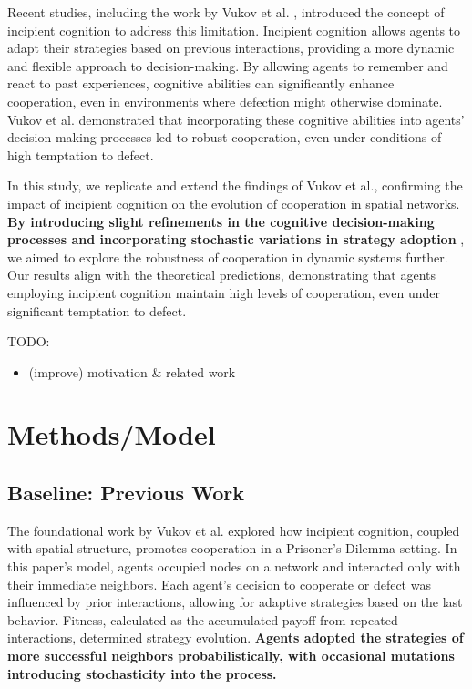 \documentclass[runningheads]{llncs}
\begin{document}
Recent studies, including the work by Vukov et al. \cite{vukov}, introduced the concept of incipient
cognition to address this limitation.
Incipient cognition allows agents to adapt their strategies based on previous
interactions, providing a more dynamic and flexible approach to decision-making.
By allowing agents to remember and react to past experiences, cognitive abilities
can significantly enhance cooperation, even in environments where defection might
otherwise dominate. Vukov et al. demonstrated that incorporating these cognitive
abilities into agents' decision-making processes led to robust cooperation,
even under conditions of high temptation to defect.

In this study, we replicate and extend the findings of Vukov et al., confirming the impact of incipient cognition on the evolution of cooperation in spatial networks. \textbf{By introducing slight refinements in the cognitive decision-making processes and incorporating stochastic variations in strategy adoption} , we aimed to explore the robustness of cooperation in dynamic systems further. Our results align with the theoretical predictions, demonstrating that agents employing incipient cognition maintain high levels of cooperation, even under significant temptation to defect.

TODO:
\begin{itemize}
    \item (improve) motivation \& related work
\end{itemize}


\section{Methods/Model}

\subsection{Baseline: Previous Work}

The foundational work by Vukov et al. \cite{vukov} explored how incipient cognition, coupled with
spatial structure, promotes cooperation in a Prisoner’s Dilemma setting.
In this paper's model, agents occupied nodes on a network and interacted only with their
immediate neighbors. Each agent's decision to cooperate or defect was influenced
by prior interactions, allowing for adaptive strategies based on the last behavior.
Fitness, calculated as the accumulated payoff from repeated interactions,
determined strategy evolution. \textbf{Agents adopted the strategies of more successful neighbors probabilistically, with occasional mutations introducing stochasticity into the process.}
\end{document}

